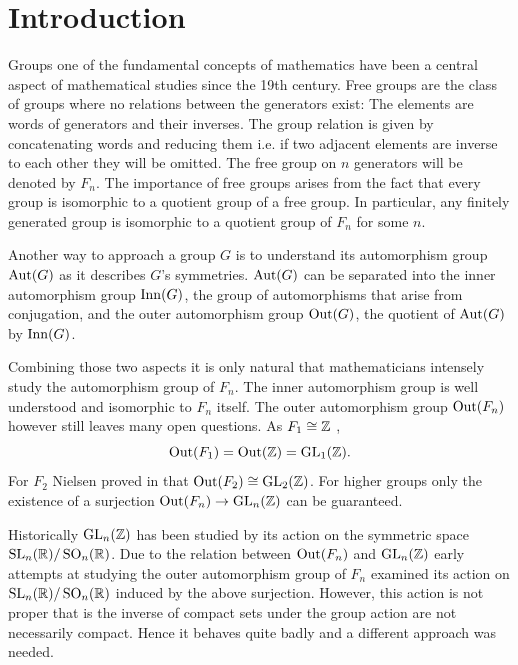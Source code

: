 %

\usepackage{./tikzit/tikzit}
\usepackage[
	sorting=none,
	sortcites=true,
	maxnames=6,
	minnames=6
]{biblatex}


\usepackage[stable]{footmisc}
\usepackage{caption}
\usepackage{subcaption}
\usepackage{listings}
\usepackage{thmtools,thm-restate}

	

\newpage
\section{Introduction}
Groups one of the fundamental concepts of mathematics have been a central aspect of mathematical studies since the 19th century.
Free groups are the class of groups where no relations between the generators exist: 
The elements are words of generators and their inverses. The group relation is given by concatenating words
and reducing them i.e. if two adjacent elements are inverse to each other they will be omitted.
The free group on $n$ generators will be denoted by $F_{n}$.
The importance of free groups arises from the fact that every group is isomorphic to a quotient group of a free group.
In particular, any finitely generated group is isomorphic to a quotient group of $F_{n}$ for some $n$.

Another way to approach a group $G$ is to understand its automorphism group $\operatorname{Aut}(G)$ as it describes $G$'s symmetries.
$\operatorname{Aut}(G)$ can be separated into the inner automorphism group $\operatorname{Inn}(G)$,
the group of automorphisms that arise from conjugation, and the outer automorphism group $\operatorname{Out}(G)$, the quotient of  $\operatorname{Aut}(G)$ by $\operatorname{Inn}(G)$.

Combining those two aspects it is only natural that mathematicians intensely study the automorphism group of $F_{n}$.
The inner automorphism group is well understood and isomorphic to $F_{n}$ itself.
The outer automorphism group $\operatorname{Out}(F_{n})$ however still leaves many open questions.
As $F_{1} \cong \mathbb{Z}$ ,
\[
	\operatorname{Out}(F_1) = \operatorname{Out}(\mathbb{Z}) = \operatorname{GL}_{1}(\mathbb{Z})
.\] 
For $F_{2}$ Nielsen proved in \cite{nielsen17} that $\operatorname{Out}(F_2) \cong \operatorname{GL}_{2}(\mathbb{Z})$.
For higher groups only the existence of a surjection $\operatorname{Out}(F_{n}) \to \operatorname{GL}_{n}(\mathbb{Z})$ can be guaranteed.

Historically $\operatorname{GL}_{n}(\mathbb{Z})$ has been studied by its action on the symmetric space $\operatorname{SL}_{n}(\mathbb{R}) / \operatorname{SO}_{n}(\mathbb{R})$.
Due to the relation between $\operatorname{Out}(F_{n})$ and $\operatorname{GL}_{n}(\mathbb{Z})$ early attempts at studying the outer automorphism group of $F_{n}$
examined its action on $\operatorname{SL}_{n}(\mathbb{R}) / \operatorname{SO}_{n}(\mathbb{R})$ induced by the above surjection.
However, this action is not proper that is the inverse of compact sets under the group action are not necessarily compact.
Hence it behaves quite badly and a different approach was needed.

